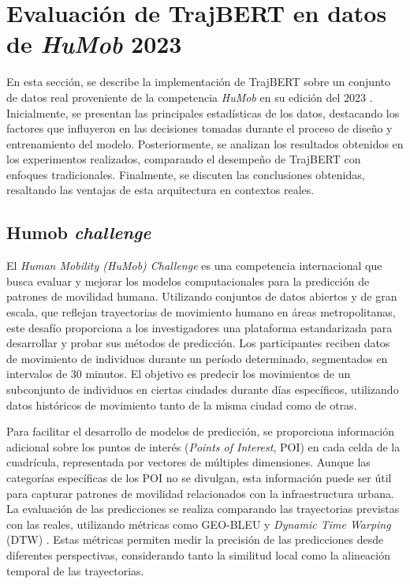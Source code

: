 \section{Evaluación de TrajBERT en datos de \textit{HuMob} 2023}

En esta sección, se describe la implementación de TrajBERT sobre un conjunto de datos real proveniente de la competencia \textit{HuMob} en su edición del 2023 \cite{humob2023}. Inicialmente, se presentan las principales estadísticas de los datos, destacando los factores que influyeron en las decisiones tomadas durante el proceso de diseño y entrenamiento del modelo. Posteriormente, se analizan los resultados obtenidos en los experimentos realizados, comparando el desempeño de TrajBERT con enfoques tradicionales. Finalmente, se discuten las conclusiones obtenidas, resaltando las ventajas de esta arquitectura en contextos reales.

\subsection{Humob \textit{challenge}}

El \textit{Human Mobility (HuMob) Challenge} \cite{humob2023} es una competencia internacional que busca evaluar y mejorar los modelos computacionales para la predicción de patrones de movilidad humana. Utilizando conjuntos de datos abiertos y de gran escala, que reflejan trayectorias de movimiento humano en áreas metropolitanas, este desafío proporciona a los investigadores una plataforma estandarizada para desarrollar y probar sus métodos de predicción. Los participantes reciben datos de movimiento de individuos durante un período determinado, segmentados en intervalos de 30 minutos. El objetivo es predecir los movimientos de un subconjunto de individuos en ciertas ciudades durante días específicos, utilizando datos históricos de movimiento tanto de la misma ciudad como de otras.

Para facilitar el desarrollo de modelos de predicción, se proporciona información adicional sobre los puntos de interés (\textit{Points of Interest}, POI) en cada celda de la cuadrícula, representada por vectores de múltiples dimensiones. Aunque las categorías específicas de los POI no se divulgan, esta información puede ser útil para capturar patrones de movilidad relacionados con la infraestructura urbana. La evaluación de las predicciones se realiza comparando las trayectorias previstas con las reales, utilizando métricas como GEO-BLEU \cite{shimizu2022geo} y \textit{Dynamic Time Warping} (DTW) \cite{muller2007dynamic}. Estas métricas permiten medir la precisión de las predicciones desde diferentes perspectivas, considerando tanto la similitud local como la alineación temporal de las trayectorias. 

